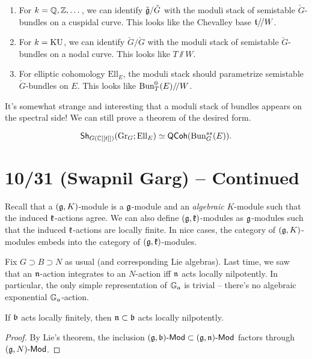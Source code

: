 \documentclass{article}
\begin{document}
\begin{enumerate}
	\item For $k = \mathbb{Q}, \mathbb{Z}, \dots$, we can identify $\check{\mathfrak{g}} / \check{G}$ with the moduli stack of semistable $\check{G}$-bundles on a cuspidal curve.
		This looks like the Chevalley base $\mathfrak{t} /\mkern-3mu/ W$.
	\item For $k = \mathrm{KU}$, we can identify $\check{G} / \check{G}$ with the moduli stack of semistable $\check{G}$-bundles on a nodal curve.
		This looks like $T \sslash W$.
	\item For elliptic cohomology $\mathrm{Ell}_E$, the moduli stack should parametrize semistable $\check{G}$-bundles on $E$.
		This looks like $\operatorname{Bun}_T^0(E) /\mkern-3mu/ W$.
\end{enumerate}

It's somewhat strange and interesting that a moduli stack of bundles appears on the spectral side!
We can still prove a theorem of the desired form.

\begin{thm}[Devalapurkar]
	\[
		\mathsf{Sh}_{G(\mathbb{C}[[t]])}(\operatorname{Gr}_G; \mathrm{Ell}_E) \simeq \mathsf{QCoh}(\mathrm{Bun}_G^{ss}(E)).
	\]
\end{thm}

\section{10/31 (Swapnil Garg) -- Continued}

Recall that a $(\mathfrak{g}, K)$-module is a $\mathfrak{g}$-module and an \emph{algebraic} $K$-module such that the induced $\mathfrak{k}$-actions agree.
We can also define $(\mathfrak{g}, \mathfrak{k})$-modules as $\mathfrak{g}$-modules such that the induced $\mathfrak{k}$-actions are locally finite.
In nice cases, the category of $(\mathfrak{g}, K)$-modules embeds into the category of $(\mathfrak{g}, \mathfrak{k})$-modules.

Fix $G \supset B \supset N$ as usual (and corresponding Lie algebras).
Last time, we saw that an $\mathfrak{n}$-action integrates to an $N$-action iff $\mathfrak{n}$ acts locally nilpotently.
In particular, the only simple representation of $\mathbb{G}_a$ is trivial -- there's no algebraic exponential $\mathbb{G}_a$-action.

\begin{prop}
	If $\mathfrak{b}$ acts locally finitely, then $\mathfrak{n} \subset \mathfrak{b}$ acts locally nilpotently.
\end{prop}

\begin{proof}
	By Lie's theorem, the inclusion $(\mathfrak{g}, \mathfrak{b})\text{-}\mathsf{Mod} \subset (\mathfrak{g}, \mathfrak{n})\text{-}\mathsf{Mod}$ factors through $(\mathfrak{g}, N)\text{-}\mathsf{Mod}$.
\end{proof}
\end{document}
